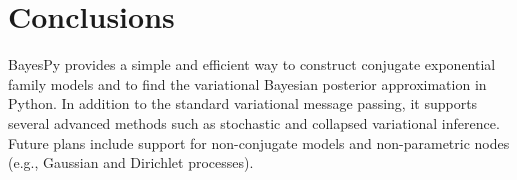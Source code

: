 \documentclass[twoside,11pt]{article}
\begin{document}

\section{Conclusions}

BayesPy provides a simple and efficient way to construct conjugate exponential
family models and to find the variational Bayesian posterior approximation in
Python.
%
In addition to the standard variational message passing, it supports several
advanced methods such as stochastic and collapsed variational inference.  Future
plans include support for non-conjugate models and non-parametric nodes (e.g.,
Gaussian and Dirichlet processes).







\vskip 0.2in

\end{document}
